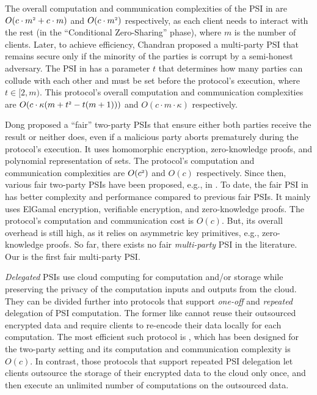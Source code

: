 The overall computation and communication complexities of the PSI in  \cite{DBLP:conf/ccs/KolesnikovMPRT17} are  $O(c\cdot m^{\scriptscriptstyle 2}+c\cdot m )$ and $O(c\cdot m^{\scriptscriptstyle 2})$ respectively, as each client needs to interact with the rest (in the ``Conditional Zero-Sharing'' phase), where $m$ is the number of clients. Later, to achieve efficiency, Chandran \et \cite{ChandranD0OSS21} proposed a multi-party PSI that remains secure only if the minority of the parties is corrupt by a semi-honest adversary. The PSI in \cite{NevoTY21} has a parameter $t$ that determines how many parties can collude with each other and must be set before the protocol's execution, where $t\in [2, m)$.  
%
%
This protocol's overall computation and communication complexities are $O(c\cdot \kappa(m+t^{\scriptscriptstyle 2}-t(m+1)))$ and $O(c\cdot m\cdot \kappa)$ respectively.


Dong \et proposed a ``fair'' two-party PSIs \cite{DBLP:conf/dbsec/DongCCR13} that ensure either both parties receive the result or neither does, even if a malicious party aborts prematurely during the protocol's execution. It uses homomorphic encryption,  zero-knowledge proofs, and polynomial representation of sets. The protocol's  computation and communication complexities are $O(c^{\scriptscriptstyle 2})$ and $O(c)$  respectively. Since then, various fair two-party PSIs have been proposed, e.g.,  in \cite{DebnathD14,DebnathD16-,DebnathD16}. To date, the fair PSI in \cite{DebnathD16} has better complexity and performance compared to previous fair PSIs. It mainly uses  ElGamal encryption, verifiable encryption, and zero-knowledge proofs. The protocol's computation and communication cost is $O(c)$. But, its overall overhead is still high, as it relies on asymmetric key primitives, e.g.,  zero-knowledge proofs. So far, there exists no fair \emph{multi-party} PSI in the literature. Our \withFai is the first  fair multi-party PSI.%


 \textit{Delegated} PSIs use  cloud computing  for computation and/or storage while preserving the privacy of  the computation inputs and outputs from the cloud. They can be divided further into protocols that support \textit{one-off} and \textit{repeated} delegation of PSI computation. The former like \cite{kamarascaling,kerschbaum12,c18} cannot reuse their outsourced encrypted data and require clients to re-encode their data locally for each computation. The most efficient such protocol is \cite{kamarascaling}, which has been designed for the two-party setting and its computation and communication complexity is $O(c)$.  In contrast, those protocols that support repeated PSI delegation let clients outsource the storage of their encrypted data to the cloud only once, and then execute an unlimited number of computations on the outsourced data. 
 
